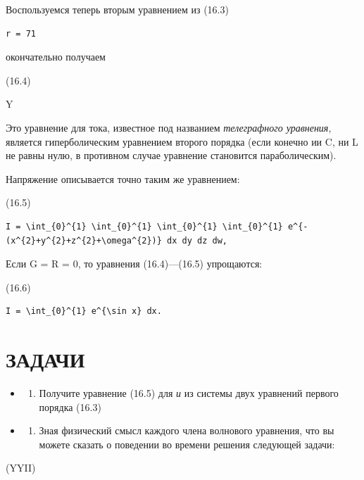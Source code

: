 \documentclass[
  ukrainian,
]{article}
\providecommand{\tightlist}{%
  \setlength{\itemsep}{0pt}\setlength{\parskip}{0pt}}
\begin{document}
Воспользуемся теперь вторым уравнением из (16.3)

\begin{verbatim}
r = 71
\end{verbatim}

окончательно получаем

(16.4)

Y

Это уравнение для тока, известное под названием \emph{телеграфного
уравнения}, является гиперболическим уравнением второго порядка (если
конечно ии C, ни L не равны нулю, в противном случае уравнение
становится параболическим).

Напряжение описывается точно таким же уравнением:

(16.5)

\begin{verbatim}
I = \int_{0}^{1} \int_{0}^{1} \int_{0}^{1} \int_{0}^{1} e^{-(x^{2}+y^{2}+z^{2}+\omega^{2})} dx dy dz dw,
\end{verbatim}

Если G = R = 0, то уравнения (16.4)---(16.5) упрощаются:

(16.6)

\begin{verbatim}
I = \int_{0}^{1} e^{\sin x} dx.
\end{verbatim}

\section{ЗАДАЧИ}\label{ux437ux430ux434ux430ux447ux438-2}

\begin{itemize}
\tightlist
\item
  \begin{enumerate}
  \def\labelenumi{\arabic{enumi}.}
  \tightlist
  \item
    Получите уравнение (16.5) для \emph{и} из системы двух уравнений
    первого порядка (16.3)
  \end{enumerate}
\item
  \begin{enumerate}
  \def\labelenumi{\arabic{enumi}.}
  \setcounter{enumi}{1}
  \tightlist
  \item
    Зная физический смысл каждого члена волнового уравнения, что вы
    можете сказать о поведении во времени решения следующей задачи:
  \end{enumerate}
\end{itemize}

(YYII)
\end{document}
